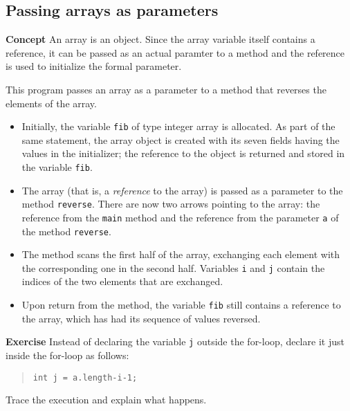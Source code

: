\subsection{Passing arrays as parameters}\label{array.03}

\textbf{Concept} An array is an object. Since the array variable itself 
contains a reference, it can be passed as an actual paramter to a method
and the reference is used to initialize the formal parameter.


This program passes an array as a parameter to a method 
that reverses the elements of the array.
\begin{itemize}
\item Initially, the variable \texttt{fib} of type integer array is 
allocated. As part of the same statement, the array object is created with 
its seven fields having the values in the initializer; the reference to 
the object is returned and stored in the variable \texttt{fib}.
\item The array (that is, a \emph{reference} to the array) is passed as a parameter to the method \texttt{reverse}. There are now two arrows pointing to the array: the reference from the \texttt{main} method and the reference from the parameter \texttt{a} of the method \texttt{reverse}.
\item The method scans the first half of the array, exchanging each element with the corresponding one in the second half. Variables \texttt{i} and \texttt{j} contain the indices of the two elements that are exchanged.
\item Upon return from the method, the variable \texttt{fib} still 
contains a reference to the array, which has had its sequence of values 
reversed.
\end{itemize}

\textbf{Exercise} Instead of declaring the variable \texttt{j} outside the for-loop,
declare it just inside the for-loop as follows:
\begin{quote}
\texttt{int j = a.length-i-1;}
\end{quote}
Trace the execution and explain what happens.
